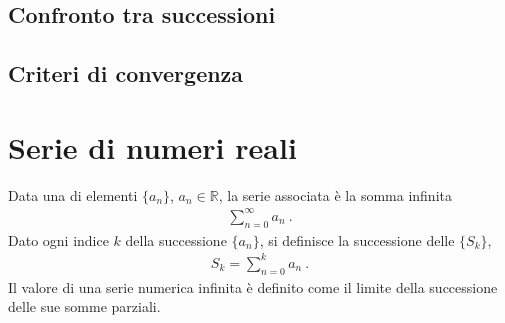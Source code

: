 \documentclass[letterpaper,10pt,italian]{jupyterBook}
\begin{document}
\sphinxAtStartPar
{} 


\subsection{Confronto tra successioni}
\label{\detokenize{ch/series/sequence-numerical-real:confronto-tra-successioni}}
\sphinxAtStartPar
{}

\sphinxAtStartPar
{} 


\subsection{Criteri di convergenza}
\label{\detokenize{ch/series/sequence-numerical-real:criteri-di-convergenza}}
\sphinxAtStartPar
{}

\sphinxAtStartPar
{} 

\sphinxAtStartPar
{}

\sphinxstepscope


\section{Serie di numeri reali}
\label{\detokenize{ch/series/series-numerical-real:serie-di-numeri-reali}}\label{\detokenize{ch/series/series-numerical-real:math-hs-series-numerical-real}}\label{\detokenize{ch/series/series-numerical-real::doc}}
\sphinxAtStartPar
{} Data una  di elementi \(\{ a_n \}\), \(a_n \in \mathbb{R}\), la serie associata è la somma infinita
\begin{equation*}
\begin{split}\sum_{n=0}^{\infty} a_n \ .\end{split}
\end{equation*}
\sphinxAtStartPar
Dato ogni indice \(k\) della successione \(\{ a_n \}\), si definisce la successione delle  \(\{ S_k \}\),
\begin{equation*}
\begin{split}S_k = \sum_{n=0}^{k} a_n \ .\end{split}
\end{equation*}
\sphinxAtStartPar
{} Il valore di una serie numerica infinita è definito come il limite della successione delle sue somme parziali.
\end{document}
